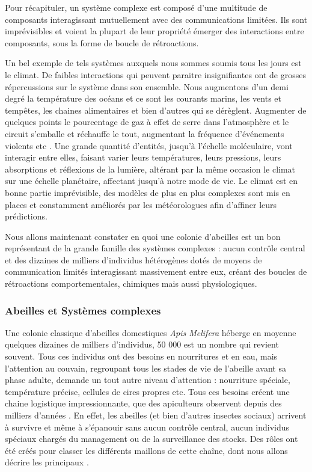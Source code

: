 			Pour récapituler, un système complexe est composé d'une multitude de composants interagissant mutuellement avec des communications limitées. Ils sont imprévisibles et voient la plupart de leur propriété émerger des interactions entre composants, sous la forme de boucle de rétroactions.
			
			Un bel exemple de tels systèmes auxquels nous sommes soumis tous les jours est le climat. De faibles interactions qui peuvent paraitre insignifiantes ont de grosses répercussions sur le système dans son ensemble. Nous augmentons d'un demi degré la température des océans et ce sont les courants marins, les vents et tempêtes, les chaines alimentaires et bien d'autres qui se dérèglent. Augmenter de quelques points le pourcentage de gaz à effet de serre dans l'atmosphère et le circuit s'emballe et réchauffe le tout, augmentant la fréquence d'événements violents etc \cite{allen_2018_2018}. Une grande quantité d'entités, jusqu'à l'échelle moléculaire, vont interagir entre elles, faisant varier leurs températures, leurs pressions, leurs absorptions et réflexions de la lumière, altérant par la même occasion le climat sur une échelle planétaire, affectant jusqu'à notre mode de vie. Le climat est en bonne partie imprévisible, des modèles de plus en plus complexes sont mis en places et constamment améliorés par les météorologues afin d'affiner leurs prédictions.
						
			Nous allons maintenant constater en quoi une colonie d'abeilles est un bon représentant de la grande famille des systèmes complexes : aucun contrôle central et des dizaines de milliers d'individus hétérogènes dotés de moyens de communication limités interagissant massivement entre eux, créant des boucles de rétroactions comportementales, chimiques mais aussi physiologiques.
			
			

	
		\subsubsection{Abeilles et Systèmes complexes}		
			Une colonie classique d'abeilles domestiques \textit{Apis Melifera} héberge en moyenne quelques dizaines de milliers d'individus, 50 000 est un nombre qui revient souvent. Tous ces individus ont des besoins en nourritures et en eau, mais l'attention au couvain, regroupant tous les stades de vie de l'abeille avant sa phase adulte, demande un tout autre niveau d'attention : nourriture spéciale, température précise, cellules de cires propres etc. Tous ces besoins créent une chaine logistique impressionnante, que des apiculteurs observent depuis des milliers d'années \cite{oldroyd_domestication_2012}. En effet, les abeilles (et bien d'autres insectes sociaux) arrivent à survivre et même à s'épanouir sans aucun contrôle central, aucun individus spéciaux chargés du management ou de la surveillance des stocks. Des rôles ont été créés pour classer les différents maillons de cette chaîne, dont nous allons décrire les principaux \cite{winston_biology_1991, winston_role_1991, seeley_age_1991}. 
			

